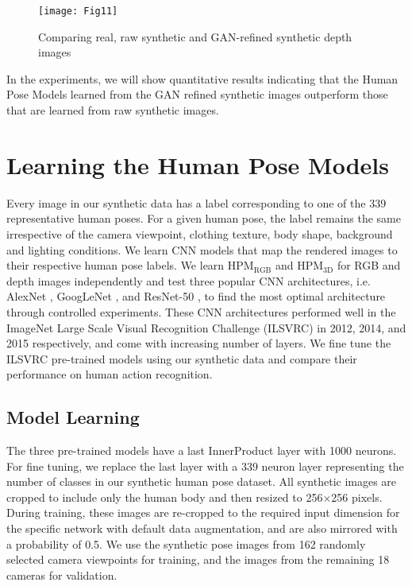 \documentclass[twocolumn]{svjour3}          \smartqed  \usepackage{graphicx}
\begin{document}
\begin{figure}[t]
\texttt{[image: Fig11]}
\caption{Comparing real, raw synthetic and GAN-refined synthetic depth images}
\label{fig:depth_GAN_compare}
\end{figure}


In the experiments, we will show quantitative results indicating that the Human Pose Models learned from the GAN refined synthetic images outperform those that are learned from raw synthetic images.


\section{Learning the Human Pose Models}

Every image in our synthetic data has a label corresponding to one of the 339 representative human poses. For a given human pose, the label remains the same irrespective of the camera viewpoint, clothing texture, body shape, background and lighting conditions. We learn CNN models that map the rendered images to their respective human pose labels. We learn HPM$_{\mathrm{RGB}}$ and HPM$_{\mathrm{3D}}$ for RGB and depth images independently and test three popular CNN architectures, i.e. AlexNet \citep{AlexNet}, GoogLeNet \citep{GoogLeNet}, and ResNet-50 \citep{ResNet}, to find the most optimal architecture through controlled experiments. These CNN architectures performed well in the ImageNet Large Scale Visual Recognition Challenge (ILSVRC) in 2012, 2014, and 2015 respectively, and come with increasing number of layers. We fine tune the ILSVRC pre-trained models using our synthetic data and compare their performance on human action recognition.


\subsection{Model Learning}

The three pre-trained models have a last InnerProduct layer with 1000 neurons. For fine tuning, we replace the last layer with a 339 neuron layer representing the number of classes in our synthetic human pose dataset. All synthetic images are cropped to include only the human body and then resized to 256$\times$256 pixels. During training, these images are re-cropped to the required input dimension for the specific network with default data augmentation, and are also mirrored with a probability of 0.5. We use the synthetic pose images from 162 randomly selected camera viewpoints for training, and the images from the remaining 18 cameras for validation.
\end{document}
